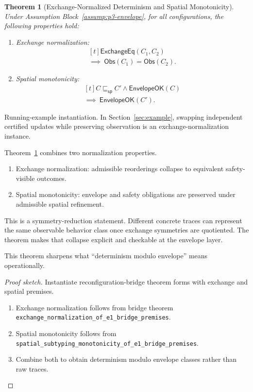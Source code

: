\documentclass[a4paper,10pt,twocolumn,english]{article}
\numberwithin{equation}{section}
\theoremstyle{paperdef}
\theoremstyle{paperplain}
\newtheorem{theorem}[definition]{Theorem}
\theoremstyle{paperdef}
\theoremstyle{paperremark}
\theoremstyle{paperdef}
\newcommand{\EnvelopeOK}{\ensuremath{\mathsf{EnvelopeOK}}}
\newcommand{\ExchangeEq}{\ensuremath{\mathsf{ExchangeEq}}}
\newcommand{\Obs}{\ensuremath{\mathsf{Obs}}}
\begin{document}
\begin{theorem}[Exchange-Normalized Determinism and Spatial Monotonicity]
	\label{thm:normalization}
	Under Assumption Block~\ref{assump:p3-envelope}, for all configurations, the following properties hold:
	\begin{enumerate}
		\item Exchange normalization:
		      \begin{equation}
			      \begin{aligned}[t]
				      \ExchangeEq(C_1,C_2)
				      \\
				      \implies\ \Obs(C_1) = \Obs(C_2).
			      \end{aligned}
		      \end{equation}
		\item Spatial monotonicity:
		      \begin{equation}
			      \begin{aligned}[t]
				      C \sqsubseteq_{\mathsf{sp}} C' \land \EnvelopeOK(C)
				      \\
				      \implies\ \EnvelopeOK(C').
			      \end{aligned}
		      \end{equation}
	\end{enumerate}
\end{theorem}

Running-example instantiation. In Section~\ref{sec:example}, swapping
independent certified updates while preserving observation is an
exchange-normalization instance.

Theorem~\ref{thm:normalization} combines two normalization properties.
\begin{enumerate}
	\item Exchange normalization: admissible reorderings collapse to equivalent safety-visible outcomes.
	\item Spatial monotonicity: envelope and safety obligations are preserved under admissible spatial refinement.
\end{enumerate}

This is a symmetry-reduction statement. Different concrete traces can represent the same observable behavior class once exchange symmetries are quotiented. The theorem makes that collapse explicit and checkable at the envelope layer.

This theorem sharpens what ``determinism modulo envelope'' means operationally.

\begin{proof}[Proof sketch]
	Instantiate reconfiguration-bridge theorem forms with exchange and spatial premises.

	\begin{enumerate}
		\item Exchange normalization follows from bridge theorem \nolinkurl{exchange_normalization_of_e1_bridge_premises}.
		\item Spatial monotonicity follows from \nolinkurl{spatial_subtyping_monotonicity_of_e1_bridge_premises}.
		\item Combine both to obtain determinism modulo envelope classes rather than raw traces.
	\end{enumerate}
\end{proof}
\end{document}
